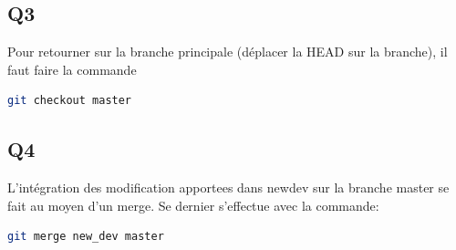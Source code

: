 \documentclass[12pt]{article}
\begin{document}
\subsection{Q3}

Pour retourner sur la branche principale (déplacer la HEAD sur la branche), il faut faire la commande
\begin{lstlisting}[language=bash]
git checkout master
\end{lstlisting}

\subsection{Q4}

L'intégration des modification apportees dans new\textunderscore dev sur la branche master se fait au moyen d'un merge.
Se dernier s'effectue avec la commande:
\begin{lstlisting}[language=bash]
git merge new_dev master
\end{lstlisting}
\end{document}
